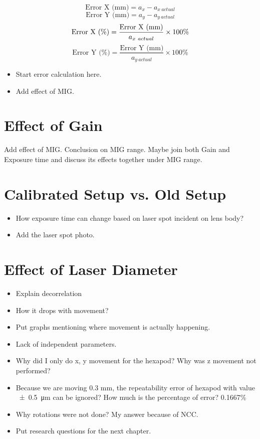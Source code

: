 \begin{equation}
    \text{Error X (mm)} = a_x - a_{x\ actual}
\end{equation}
\begin{equation}
    \text{Error Y (mm)} = a_y - a_{y\ actual}
\end{equation}
\begin{equation}
    \text{Error X (\%)} = \frac{\text{Error X (mm)}}{a_{x\ actual}} \times 100\% \\
\end{equation}
\begin{equation}
    \text{Error Y (\%)} = \frac{\text{Error Y (mm)}}{a_{y\ actual}} \times 100\%
\end{equation}

\begin{itemize}
    \item Start error calculation here.
    \item Add effect of MIG.
\end{itemize}


\section{Effect of Gain}
Add effect of MIG.
Conclusion on MIG range.
Maybe join both Gain and Exposure time and discuss its effects together under MIG range.


\section{Calibrated Setup vs. Old Setup}
\begin{itemize}
    \item How exposure time can change based on laser spot incident on lens body?
    \item Add the laser spot photo.
\end{itemize}

\section{Effect of Laser Diameter}
\begin{itemize}
    \item Explain decorrelation
    \item How it drops with movement?
    \item Put graphs mentioning where movement is actually happening.
\end{itemize}

\begin{itemize}
    \item Lack of independent parameters.
    \item Why did I only do x, y movement for the hexapod? Why was z movement not performed?
    \item Because we are moving 0.3 mm, the repeatability error of hexapod with value \SI{\pm0.5}{\micro\meter} can be ignored? How much is the percentage of error? 0.1667\%
    \item Why rotations were not done? My answer because of NCC.
    \item Put research questions for the next chapter.
\end{itemize}